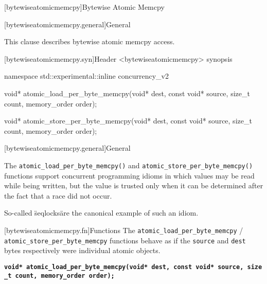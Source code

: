 
[bytewiseatomicmemcpy]{Bytewise Atomic Memcpy}

[bytewiseatomicmemcpy.general]{General}

This clause describes bytewise atomic memcpy access. 


[bytewiseatomicmemcpy.syn]{Header <bytewiseatomicmemcpy> synopsis}

\begin{codeblock}
namespace std::experimental::inline concurrency_v2 {

  void* atomic_load_per_byte_memcpy(void* dest, const void* source, size_t count, memory_order order);

  void* atomic_store_per_byte_memcpy(void* dest, const void* source, size_t count, memory_order order);

}
\end{codeblock}

[bytewiseatomicmemcpy.general]{General}
\pnum

The \texttt{atomic\_load\_per\_byte\_memcpy()} and
\texttt{atomic\_store\_per\_byte\_memcpy()} functions support concurrent
programming idioms in which values may be read while being written, but
the value is trusted only when it can be determined after the fact that
a race did not occur. \begin{note} So-called \"seqlocks\" are the canonical
example of such an idiom. \end{note}


[bytewiseatomicmemcpy.fn]{Functions}
\pnum
The \texttt{atomic\_load\_per\_byte\_memcpy} /
\texttt{atomic\_store\_per\_byte\_memcpy} functions behave as if the
\texttt{source} and \texttt{dest} bytes respectively were individual
atomic objects.

\textbf{\texttt{void*\ atomic\_load\_per\_byte\_memcpy(void*\ dest,\ const\ void*\ source,\ size\_t\ count,\ memory\_order\ order);}}


